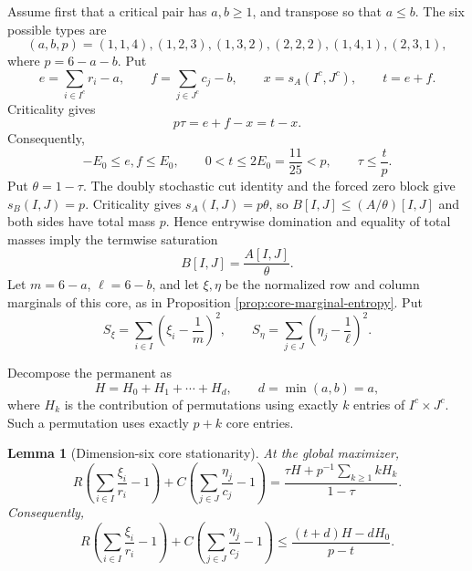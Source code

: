 \documentclass[11pt,a4paper]{article}
\numberwithin{equation}{section}
\newtheorem{lemma}[theorem]{Lemma}
\theoremstyle{definition}
\newcommand{\1}{\mathbf{1}}
\begin{document}
Assume first that a critical pair has $a,b\ge1$, and transpose so that
$a\le b$.  The six possible types are
\begin{equation}\label{eq:n6-types}
 (a,b,p)=(1,1,4),(1,2,3),(1,3,2),(2,2,2),(1,4,1),(2,3,1),
\end{equation}
where $p=6-a-b$.  Put
\begin{equation}\label{eq:n6-eftx}
 e=\sum_{i\in I^c}r_i-a,
 \qquad
 f=\sum_{j\in J^c}c_j-b,
 \qquad
 x=s_A(I^c,J^c),
 \qquad
 t=e+f.
\end{equation}
Criticality gives
\begin{equation}\label{eq:n6-tau-eft}
 p\tau=e+f-x=t-x.
\end{equation}
Consequently,
\begin{equation}\label{eq:n6-two-sided-domain}
 -E_0\le e,f\le E_0,
 \qquad
 0<t\le2E_0=\frac{11}{25}<p,
 \qquad
 \tau\le\frac tp.
\end{equation}
Put $\theta=1-\tau$.  The doubly stochastic cut identity and the forced
zero block give $s_B(I,J)=p$.  Criticality gives
$s_A(I,J)=p\theta$, so $B[I,J]\le(A/\theta)[I,J]$ and both sides have total
mass $p$.  Hence entrywise domination and equality of total masses imply the
termwise saturation
\[
 B[I,J]=\frac{A[I,J]}\theta.
\]
Let $m=6-a$, $\ell=6-b$, and let $\xi,\eta$ be the normalized row and
column marginals of this core, as in Proposition
\ref{prop:core-marginal-entropy}.  Put
\begin{equation}\label{eq:n6-Sxi}
 S_\xi=\sum_{i\in I}\left(\xi_i-\frac1m\right)^2,
 \qquad
 S_\eta=\sum_{j\in J}\left(\eta_j-\frac1\ell\right)^2.
\end{equation}

Decompose the permanent as
\[
 H=H_0+H_1+\cdots+H_d,
 \qquad d=\min(a,b)=a,
\]
where $H_k$ is the contribution of permutations using exactly $k$ entries
of $I^c\times J^c$.  Such a permutation uses exactly $p+k$ core entries.

\begin{lemma}[Dimension-six core stationarity]\label{lem:n6-core-stationarity}
At the global maximizer,
\begin{equation}\label{eq:n6-core-stationarity}
 R\left(\sum_{i\in I}\frac{\xi_i}{r_i}-1\right)
 +C\left(\sum_{j\in J}\frac{\eta_j}{c_j}-1\right)
 =\frac{\tau H+p^{-1}\sum_{k\ge1}kH_k}{1-\tau}.
\end{equation}
Consequently,
\begin{equation}\label{eq:n6-stationarity-upper}
 R\left(\sum_{i\in I}\frac{\xi_i}{r_i}-1\right)
 +C\left(\sum_{j\in J}\frac{\eta_j}{c_j}-1\right)
 \le\frac{(t+d)H-dH_0}{p-t}.
\end{equation}
\end{lemma}
\end{document}
